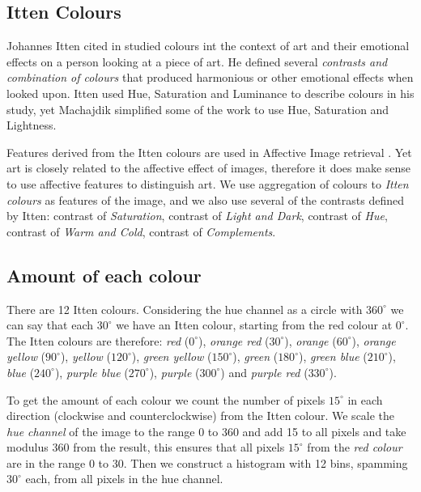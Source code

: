 \documentclass[11pt,a4paper,twoside,openright,draft]{report}
\begin{document}
\begin{multicols}{2}
\section{Itten Colours}

Johannes Itten cited in \cite{mach10clas} studied colours int the context of
art and their emotional effects on a person looking at a piece of art.  He
defined several \emph{contrasts and combination of colours} that produced
harmonious or other emotional effects when looked upon.  Itten used Hue,
Saturation and Luminance to describe colours in his study, yet Machajdik
\cite{mach10clas} simplified some of the work to use Hue, Saturation and
Lightness.

Features derived from the Itten colours are used in Affective Image retrieval
\cite{mach10clas}.  Yet art is closely related to the affective effect of
images, therefore it does make sense to use affective features to distinguish
art.  We use aggregation of colours to \emph{Itten colours} as features of the
image, and we also use several of the contrasts defined by Itten: contrast of
\emph{Saturation}, contrast of \emph{Light and Dark}, contrast of \emph{Hue},
contrast of \emph{Warm and Cold}, contrast of \emph{Complements}.

\subsection{Amount of each colour}

There are 12 Itten colours.  Considering the hue channel as a circle
with $360^{\circ}$ we can say that each $30^{\circ}$ we have an Itten colour,
starting from the red colour at $0^{\circ}$.  The Itten colours are therefore:
\emph{red}    ($0^{\circ}$),   \emph{orange red}    ($30^{\circ}$),
\emph{orange} ($60^{\circ}$),  \emph{orange yellow} ($90^{\circ}$),
\emph{yellow} ($120^{\circ}$), \emph{green yellow}  ($150^{\circ}$),
\emph{green}  ($180^{\circ}$), \emph{green blue}    ($210^{\circ}$),
\emph{blue}   ($240^{\circ}$), \emph{purple blue}   ($270^{\circ}$),
\emph{purple} ($300^{\circ}$) and \emph{purple red} ($330^{\circ}$).

To get the amount of each colour we count the number of pixels $15^{\circ}$ in
each direction (clockwise and counterclockwise) from the Itten colour.  We
scale the \emph{hue channel} of the image to the range 0 to 360 and add 15 to
all pixels and take modulus 360 from the result, this ensures that all pixels
$15^{\circ}$ from the \emph{red colour} are in the range 0 to 30.  Then we
construct a histogram with 12 bins, spamming $30^{\circ}$ each, from all pixels
in the hue channel.


\end{multicols}
\end{document}
